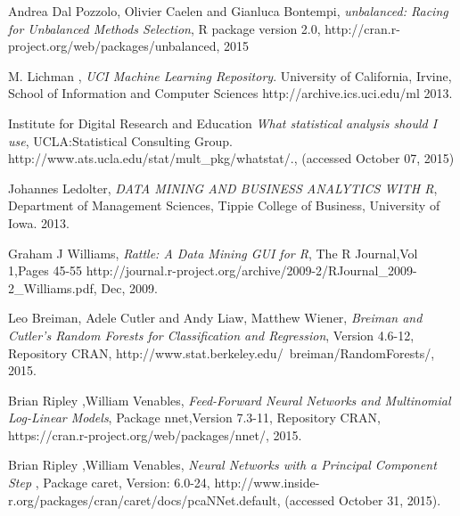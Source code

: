\documentclass{article}\usepackage[]{graphicx}\usepackage[]{color}
\begin{document}


\newpage

\begin{thebibliography}{9}

    Andrea Dal Pozzolo, Olivier Caelen and Gianluca Bontempi,
    \emph{unbalanced: Racing for Unbalanced Methods Selection},
    R package version 2.0,
    http://cran.r-project.org/web/packages/unbalanced, 
    2015

  M. Lichman , \emph{{UCI} Machine Learning Repository}.
  University of California, Irvine, School of Information and Computer Sciences
  http://archive.ics.uci.edu/ml
  2013.
  
  Institute for Digital Research and Education
  \emph{What statistical analysis should I use},
  UCLA:Statistical Consulting Group.  
  http://www.ats.ucla.edu/stat/mult\_pkg/whatstat/., 
  (accessed October 07, 2015)  

  Johannes Ledolter, \emph{DATA MINING AND BUSINESS ANALYTICS WITH R},
  Department of Management Sciences, Tippie College of Business,
  University of Iowa.
  2013.

    Graham J Williams,
    \emph{Rattle: A Data Mining GUI for R},
    The R Journal,Vol 1,Pages 45-55
    http://journal.r-project.org/archive/2009-2/RJournal\_2009-2\_Williams.pdf,
    Dec, 2009.

    Leo Breiman, Adele Cutler and Andy Liaw, Matthew Wiener,
    \emph{Breiman and Cutler's Random Forests for Classification and Regression},
    Version 4.6-12, Repository CRAN,
    http://www.stat.berkeley.edu/~breiman/RandomForests/, 
    2015.

    Brian Ripley ,William Venables,
    \emph{Feed-Forward Neural Networks and Multinomial Log-Linear Models},
    Package nnet,Version 7.3-11, Repository CRAN,
    https://cran.r-project.org/web/packages/nnet/, 
    2015.

    Brian Ripley ,William Venables,
    \emph{Neural Networks with a Principal Component Step },
    Package caret, Version: 6.0-24,
    http://www.inside-r.org/packages/cran/caret/docs/pcaNNet.default, 
    (accessed October 31, 2015).

\end{thebibliography}
\end{document}
